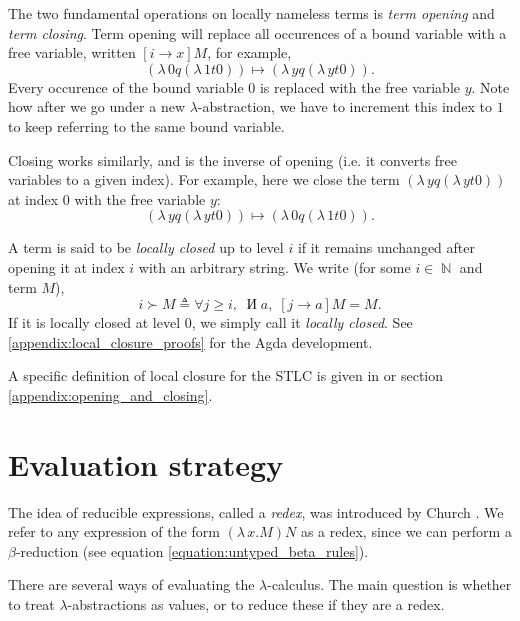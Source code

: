 \documentclass[logo,bsc,singlespacing,parskip,online]{infthesis}
\DeclareMathOperator{\nat}{\mathbb{N}}
\DeclareMathOperator{\cof}{\text{И}}
\begin{document}
The two fundamental operations on locally nameless terms is \textit{term opening} and \textit{term
closing}. Term opening will replace all occurences of a bound variable with a free variable, written
$[i \to x] M$, for example,
\begin{equation*}
  [0 \to y] (\lambda \, 0 q (\lambda \, 1 t 0)) \mapsto (\lambda \, y q (\lambda \, y t 0)).
\end{equation*}
Every occurence of the bound variable $0$ is replaced with the free variable $y$. Note how after we
go under a new $\lambda$-abstraction, we have to increment this index to $1$ to keep referring to
the same bound variable.

Closing works similarly, and is the inverse of opening (i.e. it converts free variables to a given
index). For example, here we close the term $(\lambda \, y q (\lambda \, y t 0))$ at index $0$ with
the free variable $y$:
\begin{equation*}
  [0 \rightarrow y] (\lambda \, y q (\lambda \, y t 0)) \mapsto (\lambda \, 0 q (\lambda \, 1 t 0)).
\end{equation*}

A term is said to be \textit{locally closed} up to level $i$ if it remains unchanged after opening
it at index $i$ with an arbitrary string. We write (for some $i \in \nat$ and term $M$),
\begin{equation}
  \label{equation:local_closure}
  i \succ M \triangleq \forall j \geq i, \; \cof a , \; [j \to a] M = M.  
\end{equation}
If it is locally closed at level $0$, we simply call it \textit{locally closed}. See
\ref{appendix:local_closure_proofs} for the Agda development.

A specific definition of local closure for the STLC is given in \citet{chargueraud_locally_2012} or
section \ref{appendix:opening_and_closing}.

\section{Evaluation strategy}
\label{section:evaluation_strategy}
The idea of reducible expressions, called a \textit{redex}, was introduced by Church
\cite[p.~56]{pierce_types_2002}. We refer to any expression of the form $(\lambda \, x. M) N$ as a
redex, since we can perform a $\beta$-reduction (see equation \ref{equation:untyped_beta_rules}).

There are several ways of evaluating the $\lambda$-calculus. The main question is whether to treat
$\lambda$-abstractions as values, or to reduce these if they are a redex.
\end{document}
